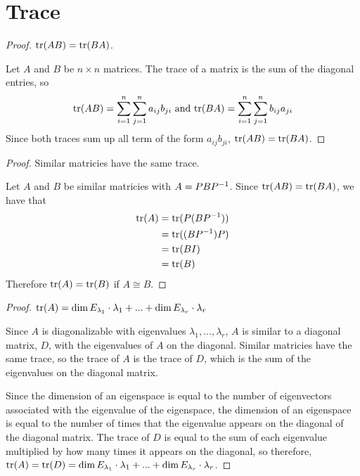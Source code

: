 \section{Trace}
\begin{proof} $\text{tr}(AB) = \text{tr}(BA)$.\gap

    Let $A$ and $B$ be $n \times n$ matrices.
    The trace of a matrix is the sum of the diagonal entries,
    so 
    \[
        \text{tr}(AB) =\sum_{i=1}^n \sum_{j=1}^n a_{ij} b_{ji}
        \text{ and }
        \text{tr}(BA) =\sum_{i=1}^n \sum_{j=1}^n b_{ij} a_{ji}
    \]
    Since both traces sum up all term of the form $a_{ij} b_{ji}$,
    $\text{tr}(AB) = \text{tr}(BA)$.
\end{proof}

\begin{proof} Similar matricies have the same trace.\gap

    Let $A$ and $B$ be similar matricies with $A = PBP^{-1}$.
    Since $\text{tr}(AB) = \text{tr}(BA)$, we have that
    \begin{align*}
        \text{tr}(A)
        &= \text{tr}(P(BP^{-1}))\\
        &= \text{tr}((BP^{-1})P)\\
        &= \text{tr}(BI)\\
        &= \text{tr}(B)
    \end{align*}
    Therefore $\text{tr}(A) = \text{tr}(B)$ if $A \cong B$.
\end{proof}

\begin{proof} 
    $\text{tr}(A) = \dim E_{\lambda_1} \cdot \lambda_1 + ... + \dim E_{\lambda_r} \cdot \lambda_r$\gap
    
    Since $A$ is diagonalizable with eigenvalues $\lambda_1,...,\lambda_r$,
    $A$ is similar to a diagonal matrix, $D$, with the eigenvalues of $A$ on the diagonal.
    Similar matricies have the same trace, so
    the trace of $A$ is the trace of $D$,
    which is the sum of the eigenvalues on the diagonal matrix.\gap

    Since the dimension of an eigenspace is equal to the number of eigenvectors
    associated with the eigenvalue of the eigenspace,
    the dimension of an eigenspace is equal to the number of times that 
    the eigenvalue appears on the diagonal of the diagonal matrix.
    The trace of $D$ is equal to the 
    sum of each eigenvalue multiplied by how many times it appears on the diagonal, 
    so therefore,
    $\text{tr}(A) = \text{tr}(D) = \dim E_{\lambda_1} \cdot \lambda_1 + ... + \dim E_{\lambda_r} \cdot \lambda_r$.

\end{proof}